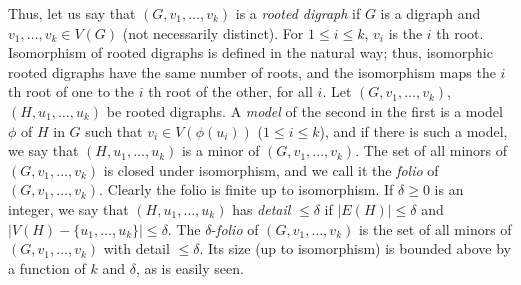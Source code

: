 Thus, let us say that $(G, v_1, \dots, v_k)$ is a \textit{rooted digraph} if $G$ is a digraph and $v_1, \dots, v_k \in V(G)$ (not necessarily distinct). For $1 \le i \le k$, $v_i$ is the $i$ th root. Isomorphism of rooted digraphs is defined in the natural way; thus, isomorphic rooted digraphs have the same number of roots, and the isomorphism maps the $i$ th root of one to the $i$ th root of the other, for all $i$. Let $(G, v_1, \dots, v_k)$, $(H, u_1, \dots, u_k)$ be rooted digraphs. A \textit{model} of the second in the first is a model $\phi$ of $H$ in $G$ such that $v_i \in V(\phi(u_i))$ ($1 \le i \le k$), and if there is such a model, we say that $(H, u_1, \dots, u_k)$ is a minor of $(G, v_1, \dots, v_k)$. The set of all minors of $(G, v_1, \dots, v_k)$ is closed under isomorphism, and we call it the \textit{folio} of $(G, v_1, \dots, v_k)$. Clearly the folio is finite up to isomorphism. If $\delta \ge 0$ is an integer, we say that $(H, u_1, \dots, u_k)$ has \textit{detail} $\le \delta$ if $|E(H)| \le \delta$ and $|V(H) - \{u_1, \dots, u_k\}| \le \delta$. The $\delta$-\textit{folio} of $(G, v_1, \dots, v_k)$ is the set of all minors of $(G, v_1, \dots, v_k)$ with detail $\le \delta$. Its size (up to isomorphism) is bounded above by a function of $k$ and $\delta$, as is easily seen.

